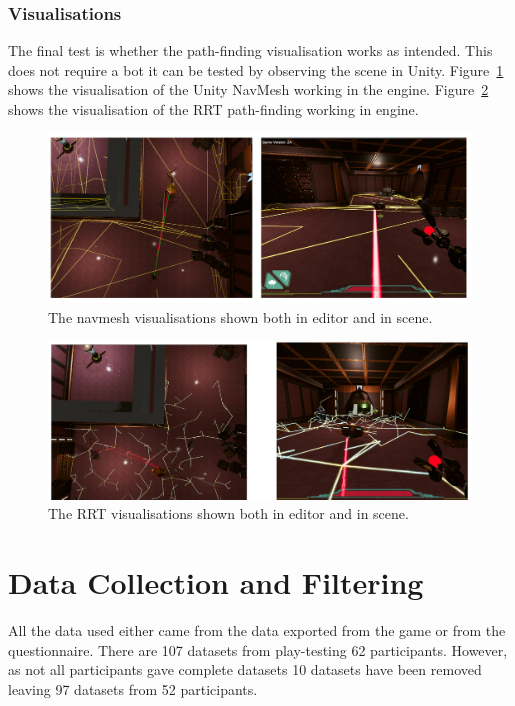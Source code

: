 \documentclass[journal]{IEEEtran}
\begin{document}
	\subsubsection{Visualisations}
	The final test is whether the path-finding visualisation works as intended. This does not require a bot it can be tested by observing the scene in Unity. Figure~\ref{image:navmeshVisuals} shows the visualisation of the Unity NavMesh working in the engine.  Figure~\ref{image:RRTVisuals} shows the visualisation of the RRT path-finding working in engine.
	
	\begin{figure}[h]
		\includegraphics[width=1.0\linewidth]{NavmeshVis.png}
		\caption{The navmesh visualisations shown both in editor and in scene.}
		\label{image:navmeshVisuals}
	\end{figure}  
	
	
	\begin{figure}[h]
		\includegraphics[width=1.0\linewidth]{RRTVis.png}
		\caption{The RRT visualisations shown both in editor and in scene.}
		\label{image:RRTVisuals}
	\end{figure}  
	
	\section{Data Collection and Filtering}  \label{datacollection}
	All the data used either came from the data exported from the game or from the questionnaire.  There are 107 datasets from play-testing 62 participants. However, as not all participants gave complete datasets 10 datasets have been removed leaving 97 datasets from 52 participants. 
	
\end{document}

